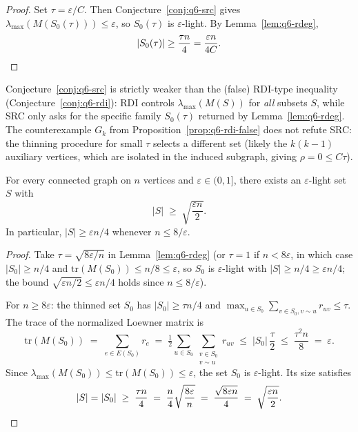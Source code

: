 \begin{proof}
Set $\tau=\varepsilon/C$.
Then Conjecture~\ref{conj:q6-src} gives
$\lambda_{\max}(M(S_0(\tau)))\le\varepsilon$, so $S_0(\tau)$ is
$\varepsilon$-light. By Lemma~\ref{lem:q6-rdeg},
\[
|S_0(\tau)|\ge \frac{\tau n}{4}=\frac{\varepsilon n}{4C}.
\qedhere
\]
\end{proof}

\begin{remark}
Conjecture~\ref{conj:q6-src} is strictly weaker than the (false)
RDI-type inequality (Conjecture~\ref{conj:q6-rdi}): RDI controls
$\lambda_{\max}(M(S))$ for \emph{all} subsets $S$, while SRC only asks
for the specific family $S_0(\tau)$ returned by
Lemma~\ref{lem:q6-rdeg}.
The counterexample $G_k$ from Proposition~\ref{prop:q6-rdi-false}
does not refute SRC: the thinning procedure for small $\tau$ selects
a different set (likely the $k(k-1)$ auxiliary vertices, which are
isolated in the induced subgraph, giving $\rho=0\le C\tau$).
\end{remark}

\begin{theorem}
\label{thm:q6-sqrt}
For every connected graph on $n$ vertices and $\varepsilon\in(0,1]$,
there exists an $\varepsilon$-light set $S$ with
\[
|S|\;\ge\;\sqrt{\frac{\varepsilon n}{2}}.
\]
In particular, $|S|\ge\varepsilon n/4$ whenever $n\le 8/\varepsilon$.
\end{theorem}

\begin{proof}
Take $\tau=\sqrt{8\varepsilon/n}$ in Lemma~\ref{lem:q6-rdeg}
(or $\tau=1$ if $n<8\varepsilon$, in which case $|S_0|\ge n/4$
and $\mathrm{tr}(M(S_0))\le n/8\le\varepsilon$, so $S_0$ is
$\varepsilon$-light with $|S|\ge n/4\ge\varepsilon n/4$;
the bound $\sqrt{\varepsilon n/2}\le\varepsilon n/4$ holds since
$n\le 8/\varepsilon$).

For $n\ge 8\varepsilon$: the thinned set $S_0$ has
$|S_0|\ge\tau n/4$ and
$\max_{u\in S_0}\sum_{v\in S_0,v\sim u}r_{uv}\le\tau$.
The trace of the normalized Loewner matrix is
\[
\mathrm{tr}(M(S_0))
\;=\;\sum_{e\in E(S_0)}r_e
\;=\;\tfrac12\sum_{u\in S_0}\sum_{\substack{v\in S_0\\v\sim u}}r_{uv}
\;\le\;|S_0|\,\frac\tau2
\;\le\;\frac{\tau^2 n}{8}
\;=\;\varepsilon.
\]
Since $\lambda_{\max}(M(S_0))\le\mathrm{tr}(M(S_0))\le\varepsilon$,
the set $S_0$ is $\varepsilon$-light.
Its size satisfies
\[
|S|=|S_0|\;\ge\;\frac{\tau n}{4}
\;=\;\frac{n}{4}\sqrt{\frac{8\varepsilon}{n}}
\;=\;\frac{\sqrt{8\varepsilon n}}{4}
\;=\;\sqrt{\frac{\varepsilon n}{2}}.\qedhere
\]
\end{proof}


